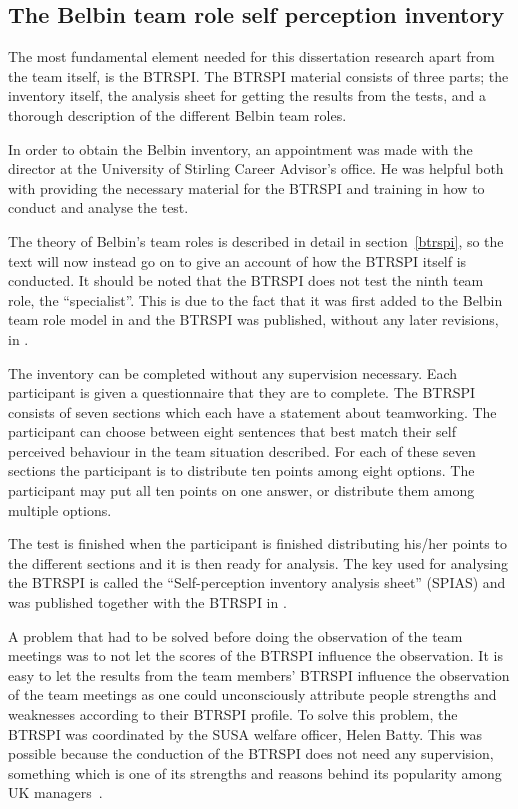 \documentclass[a4paper,12pt,titlepage]{report}
\begin{document}
  \subsection{The Belbin team role self perception inventory}
  The most fundamental element needed for this dissertation research apart from
  the team itself, is the BTRSPI. The BTRSPI material consists of three
  parts; the inventory itself,
  the analysis sheet for getting the results from the tests, 
  and a thorough description of the different Belbin team roles.

  In order to obtain the Belbin inventory, an appointment was made with the director
  at the University of Stirling Career Advisor's office.
  He was helpful both with providing the necessary material
  for the BTRSPI and training in how to conduct and analyse the test.

  The theory of Belbin's team roles is described
  in detail in section~\ref{btrspi}, so the text will now instead go on to give
  an account of how the BTRSPI itself is conducted.
  It should be noted that the BTRSPI does not test the ninth team role,
  the ``specialist''. This is due to the fact that it was first added
  to the Belbin team role model in \citet{rmb2} and the BTRSPI was
  published, without any later revisions, in \citet{rmb}.

  The inventory can be completed without any supervision necessary.
  Each participant is given a questionnaire that they are to complete. 
  The BTRSPI consists of seven sections which
  each have a statement about teamworking. The participant can choose between
  eight sentences that best match their self perceived behaviour in the team
  situation described. For each of these seven sections
  the participant is to distribute ten points among eight options. The participant may
  put all ten points on one answer, or distribute them among multiple options.

  The test is finished when the participant is finished distributing
  his/her points to the different sections and
  it is then ready for analysis. The key used for analysing the
  BTRSPI is called the ``Self-perception inventory analysis sheet'' (SPIAS) and
  was published together with the BTRSPI in \citet{rmb}. 

  A problem that had to be solved before doing the observation of the team
  meetings was to not let the scores of the BTRSPI influence the observation.
  It is easy to let the results from the team members' BTRSPI influence the
  observation of the team meetings as one could unconsciously attribute people
  strengths and weaknesses according to their BTRSPI profile. To solve this
  problem, the BTRSPI was coordinated by the SUSA welfare officer, Helen Batty.
  This was possible because the conduction of the BTRSPI does not need
  any supervision, something which is one of its strengths and reasons
  behind its popularity among UK managers~\cite[33]{sbab}.
\end{document}
